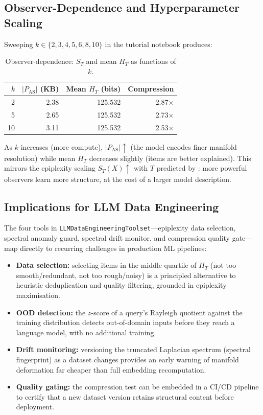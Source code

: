 \documentclass[12pt,a4paper]{article}
\theoremstyle{plain}
\theoremstyle{definition}
\theoremstyle{remark}
\newcommand{\1}{\mathbf{1}}
\begin{document}
	\subsection{Observer-Dependence and Hyperparameter Scaling}
	
	Sweeping $k\in\{2,3,4,5,6,8,10\}$ in the tutorial notebook produces:
	
	\begin{table}[H]
		\centering
		\caption{Observer-dependence: $S_T$ and mean $H_T$ as functions of $k$.}
		\label{tab:observer}
		\begin{tabular}{rrrr}
			\toprule
			$k$ & $|P_\mathrm{AS}|$ (KB) & Mean $H_T$ (bits) & Compression \\
			\midrule
			2  & 2.38 & 125.532 & 2.87$\times$ \\
			5  & 2.65 & 125.532 & 2.73$\times$ \\
			10 & 3.11 & 125.532 & 2.53$\times$ \\
			\bottomrule
		\end{tabular}
	\end{table}
	
	As $k$ increases (more compute), $|P_\mathrm{AS}|\uparrow$ (the model
	encodes finer manifold resolution) while mean $H_T$ decreases slightly
	(items are better explained).
	This mirrors the epiplexity scaling $S_T(X)\uparrow$ with $T$ predicted
	by \cite{finzi2026epiplexity}: more powerful observers learn more
	structure, at the cost of a larger model description.
	
	\subsection{Implications for LLM Data Engineering}
	
	The four tools in \texttt{LLMDataEngineeringToolset}---epiplexity data
	selection, spectral anomaly guard, spectral drift monitor, and
	compression quality gate---map directly to recurring challenges in
	production ML pipelines:
	
	\begin{itemize}
		\item \textbf{Data selection:} selecting items in the middle quartile
		of $H_T$ (not too smooth/redundant, not too rough/noisy) is a
		principled alternative to heuristic deduplication and quality
		filtering, grounded in epiplexity maximisation.
		\item \textbf{OOD detection:} the $z$-score of a query's Rayleigh
		quotient against the training distribution detects out-of-domain
		inputs before they reach a language model, with no additional
		training.
		\item \textbf{Drift monitoring:} versioning the truncated Laplacian
		spectrum (spectral fingerprint) as a dataset changes provides
		an early warning of manifold deformation far cheaper than
		full embedding recomputation.
		\item \textbf{Quality gating:} the compression test can be embedded
		in a CI/CD pipeline to certify that a new dataset version
		retains structural content before deployment.
	\end{itemize}
	
\end{document}

